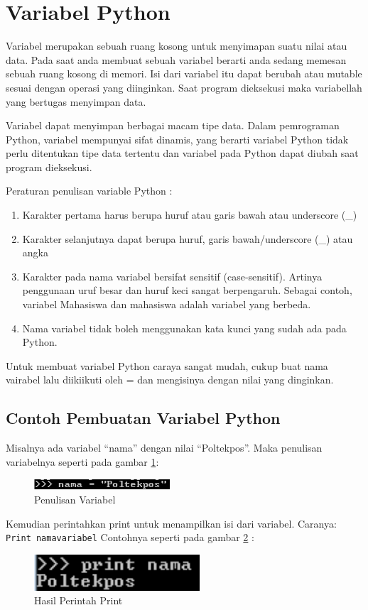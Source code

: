 \section{Variabel Python}
Variabel merupakan sebuah ruang kosong untuk menyimapan suatu nilai atau data. Pada saat anda membuat sebuah variabel berarti anda sedang memesan sebuah ruang kosong di memori. Isi dari variabel itu dapat berubah atau mutable sesuai dengan operasi yang diinginkan. Saat program dieksekusi maka variabellah yang bertugas menyimpan data. 

Variabel dapat menyimpan berbagai macam tipe data. Dalam pemrograman Python, variabel mempunyai sifat dinamis, yang berarti variabel Python tidak perlu ditentukan tipe data tertentu dan variabel pada Python dapat diubah saat program dieksekusi.

Peraturan penulisan variable Python :
\begin{enumerate}
\item Karakter pertama harus berupa huruf atau garis bawah atau underscore (\_)
\item Karakter selanjutnya dapat berupa huruf, garis bawah/underscore (\_) atau angka
\item Karakter pada nama variabel bersifat sensitif (case-sensitif). Artinya penggunaan uruf besar dan huruf keci sangat berpengaruh. Sebagai contoh, variabel Mahasiswa dan mahasiswa adalah variabel yang berbeda.
\item Nama variabel tidak boleh menggunakan kata kunci yang sudah ada pada Python.
\end{enumerate}
Untuk membuat variabel Python caraya sangat mudah, cukup buat nama vairabel lalu diikiikuti oleh = dan mengisinya dengan nilai yang dinginkan.

\subsection{Contoh Pembuatan Variabel Python}
Misalnya ada variabel “nama” dengan nilai “Poltekpos”. Maka penulisan variabelnya seperti pada gambar \ref{fig:penulisanvariabel}:
\begin{figure}[!htbp]
	\centerline{\includegraphics[width=0.45\textwidth]{figures/2/penulisanvariabel.PNG}}
	\caption{Penulisan Variabel}
	\label{fig:penulisanvariabel}
\end{figure}

Kemudian perintahkan print untuk menampilkan isi dari variabel. Caranya: \verb|Print namavariabel|
Contohnya seperti pada gambar \ref{fig:hasilperintahprint} :
\begin{figure}[!htbp]
	\centerline{\includegraphics[width=0.55\textwidth]{figures/2/hasilperintahprint}}
	\caption{Hasil Perintah Print}
	\label{fig:hasilperintahprint}
\end{figure}

